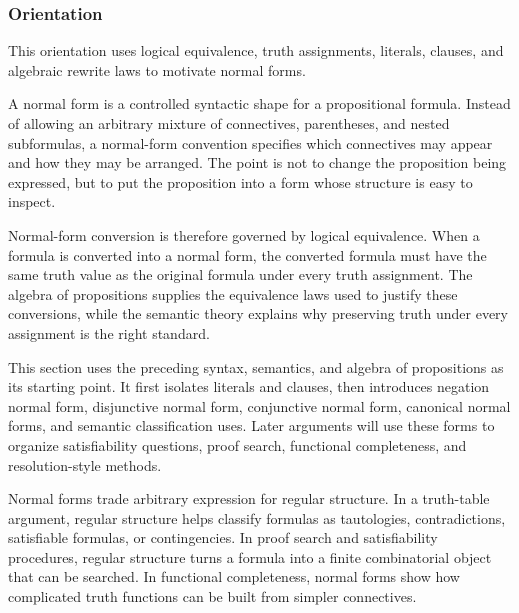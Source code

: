 \subsubsection*{Orientation}

\begin{tcolorbox}[
  colback=gray!6,
  colframe=gray!40,
  arc=2pt,
  left=8pt, right=8pt, top=6pt, bottom=6pt,
  title={\small\textbf{Toolkit}},
  fonttitle=\small\bfseries
]
This orientation uses logical equivalence, truth assignments, literals, clauses,
and algebraic rewrite laws to motivate normal forms.
\end{tcolorbox}

\begin{remark*}[Exposition]
A normal form is a controlled syntactic shape for a propositional formula.
Instead of allowing an arbitrary mixture of connectives, parentheses, and
nested subformulas, a normal-form convention specifies which connectives may
appear and how they may be arranged. The point is not to change the proposition
being expressed, but to put the proposition into a form whose structure is easy
to inspect.

Normal-form conversion is therefore governed by logical equivalence. When a
formula is converted into a normal form, the converted formula must have the
same truth value as the original formula under every truth assignment. The
algebra of propositions supplies the equivalence laws used to justify these
conversions, while the semantic theory explains why preserving truth under
every assignment is the right standard.
\end{remark*}

\begin{remark*}
This section uses the preceding syntax, semantics, and algebra of propositions
as its starting point. It first isolates literals and clauses, then introduces
negation normal form, disjunctive normal form, conjunctive normal form,
canonical normal forms, and semantic classification uses. Later arguments
will use these forms to organize satisfiability questions, proof search,
functional completeness, and resolution-style methods.
\end{remark*}

\begin{remark*}
Normal forms trade arbitrary expression for regular structure. In a truth-table
argument, regular structure helps classify formulas as tautologies,
contradictions, satisfiable formulas, or contingencies. In proof search and
satisfiability procedures, regular structure turns a formula into a finite
combinatorial object that can be searched. In functional completeness, normal
forms show how complicated truth functions can be built from simpler
connectives.
\end{remark*}
